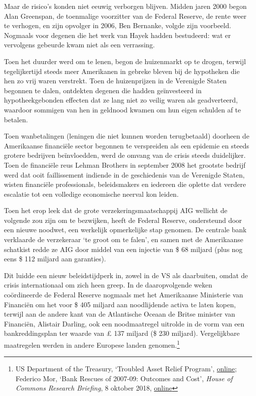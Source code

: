 \documentclass[smalldemyvopaper,11pt,twoside,onecolumn,openright,extrafontsizes,hidelinks]{memoir}
\begin{document}
Maar de risico's konden niet eeuwig verborgen blijven. Midden jaren 2000
begon Alan Greenspan, de toenmalige voorzitter van de Federal Reserve,
de rente weer te verhogen, en zijn opvolger in 2006, Ben Bernanke,
volgde zijn voorbeeld. Nogmaals voor degenen die het werk van Hayek
hadden bestudeerd: wat er vervolgens gebeurde kwam niet als een
verrassing.

Toen het duurder werd om te lenen, begon de huizenmarkt op te drogen,
terwijl tegelijkertijd steeds meer Amerikanen in gebreke bleven bij de
hypotheken die hen zo vrij waren verstrekt. Toen de huizenprijzen in de
Verenigde Staten begonnen te dalen, ontdekten degenen die hadden
geïnvesteerd in hypotheekgebonden effecten dat ze lang niet zo veilig
waren als geadverteerd, waardoor sommigen van hen in geldnood kwamen om
hun eigen schulden af te betalen.

Toen wanbetalingen (leningen die niet kunnen worden terugbetaald)
doorheen de Amerikaanse financiële sector begonnen te verspreiden als
een epidemie en steeds grotere bedrijven beïnvloedden, werd de omvang
van de crisis steeds duidelijker. Toen de financiële reus Lehman
Brothers in september 2008 het grootste bedrijf werd dat ooit
faillissement indiende in de geschiedenis van de Verenigde Staten,
wisten financiële professionals, beleidsmakers en iedereen die oplette
dat verdere escalatie tot een volledige economische neerval kon leiden.

Toen het erop leek dat de grote verzekeringsmaatschappij AIG wellicht de
volgende zou zijn om te bezwijken, heeft de Federal Reserve, ondersteund
door een nieuwe noodwet, een werkelijk opmerkelijke stap genomen. De
centrale bank verklaarde de verzekeraar `te groot om te falen', en samen
met de Amerikaanse schatkist redde ze AIG door middel van een injectie
van \$ 68 miljard (plus nog eens \$ 112 miljard aan garanties).

Dit luidde een nieuw beleidstijdperk in, zowel in de VS als daarbuiten,
omdat de crisis internationaal om zich heen greep. In de daaropvolgende
weken coördineerde de Federal Reserve nogmaals met het Amerikaanse
Ministerie van Financiën om het voor \$ 405 miljard aan noodlijdende
activa te laten kopen, terwijl aan de andere kant van de Atlantische
Oceaan de Britse minister van Financiën, Alistair Darling, ook een
noodmaatregel uitrolde in de vorm van een bankreddingsplan ter waarde
van £ 137 miljard (\$ 230 miljard). Vergelijkbare maatregelen werden in
andere Europese landen genomen.\footnote{US Department of the Treasury,
  `Troubled Asset Relief Program',
  \href{https://home.treasury.gov/data/troubled-asset-relief-program}{online};
  Federico Mor, `Bank Rescues of 2007-09: Outcomes and Cost',
  \emph{House of Commons Research Briefing}, 8 oktober 2018,
  \href{https://commonslibrary.parliament.uk/research-briefings/sn05748/}{online}}
\end{document}
